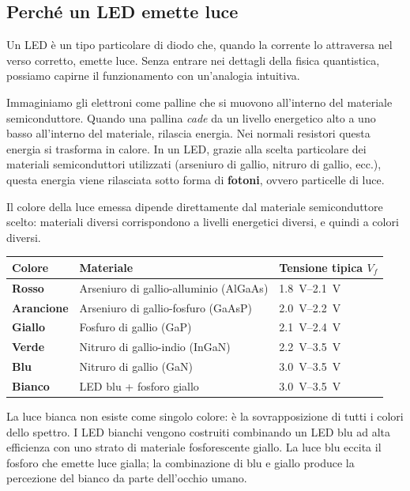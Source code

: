 \subsection*{Perché un LED emette luce}

Un LED è un tipo particolare di diodo che, quando la corrente lo attraversa nel verso corretto, emette luce. Senza entrare nei dettagli della fisica quantistica, possiamo capirne il funzionamento con un'analogia intuitiva.

Immaginiamo gli elettroni come palline che si muovono all'interno del materiale semiconduttore. Quando una pallina \textit{cade} da un livello energetico alto a uno basso all'interno del materiale, rilascia energia. Nei normali resistori questa energia si trasforma in calore. In un LED, grazie alla scelta particolare dei materiali semiconduttori utilizzati (arseniuro di gallio, nitruro di gallio, ecc.), questa energia viene rilasciata sotto forma di \textbf{fotoni}, ovvero particelle di luce.

Il colore della luce emessa dipende direttamente dal materiale semiconduttore scelto: 
materiali diversi corrispondono a livelli energetici diversi, e quindi a colori diversi.

\begin{center}
\begin{tabular}{>{\bfseries}l l l}
    \toprule
    Colore & Materiale & Tensione tipica $V_f$ \\
    \midrule
    Rosso    & Arseniuro di gallio-alluminio (AlGaAs) & \SIrange{1.8}{2.1}{\volt} \\
    Arancione & Arseniuro di gallio-fosfuro (GaAsP)   & \SIrange{2.0}{2.2}{\volt} \\
    Giallo   & Fosfuro di gallio (GaP)                & \SIrange{2.1}{2.4}{\volt} \\
    Verde    & Nitruro di gallio-indio (InGaN)         & \SIrange{2.2}{3.5}{\volt} \\
    Blu      & Nitruro di gallio (GaN)                & \SIrange{3.0}{3.5}{\volt} \\
    Bianco   & LED blu + fosforo giallo               & \SIrange{3.0}{3.5}{\volt} \\
    \bottomrule
\end{tabular}
\end{center}

\begin{tcolorbox}[colback=blue!4, colframe=blue!60, title=\textbf{Curiosità: il LED bianco}]
    La luce bianca non esiste come singolo colore: è la sovrapposizione di tutti i 
    colori dello spettro. I LED bianchi vengono costruiti combinando un LED blu ad 
    alta efficienza con uno strato di materiale fosforescente giallo. La luce blu 
    eccita il fosforo che emette luce gialla; la combinazione di blu e giallo produce 
    la percezione del bianco da parte dell'occhio umano.
\end{tcolorbox}

